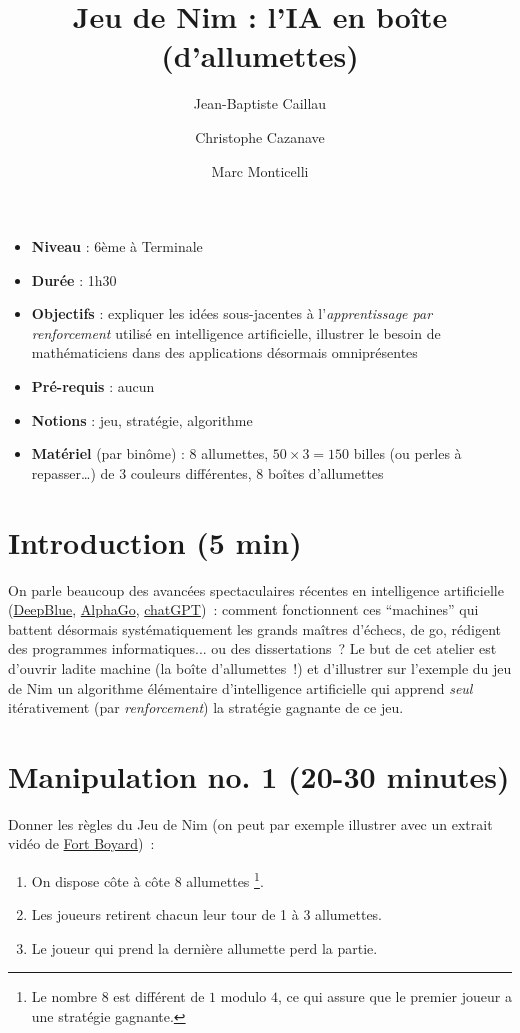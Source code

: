 \documentclass[a4paper,12pt]{article}
\title{\bf Jeu de Nim : l'IA en boîte (d'allumettes)}
\author{\normalsize Jean-Baptiste Caillau}
\author{\normalsize Christophe Cazanave}
\author{\normalsize Marc Monticelli}
\affil{Université Côte d’Azur, CNRS, LJAD, France}
\date{}
\begin{document}
\maketitle
\label{jeu-de-nim-lia-en-boite-dallumettes}

\begin{itemize}
\item
  \textbf{Niveau} : 6ème à Terminale
\item
  \textbf{Durée} : 1h30
\item
  \textbf{Objectifs} : expliquer les idées sous-jacentes à l'\emph{apprentissage par renforcement} utilisé en intelligence artificielle, illustrer le besoin de mathématiciens dans des applications désormais omniprésentes
\item
  \textbf{Pré-requis} : aucun
\item
  \textbf{Notions} : jeu, stratégie, algorithme
\item
  \textbf{Matériel} (par binôme) : 8 allumettes, $50 \times 3 = 150$ billes (ou perles à repasser\ldots) de 3 couleurs différentes, 8 boîtes d'allumettes
\end{itemize}

\section{Introduction (5 min)} \label{introduction-5-min}
\noindent On parle beaucoup des avancées spectaculaires récentes en intelligence artificielle (\href{https://www.ibm.com/ibm/history/ibm100/us/en/icons/deepblue}{DeepBlue}, \href{https://www.deepmind.com/research/highlighted-research}{AlphaGo}, \href{https://openai.com/blog/chatgpt}{chatGPT})~: comment fonctionnent ces ``machines'' qui battent désormais systématiquement les grands maîtres d'échecs, de go, rédigent des programmes informatiques... ou des dissertations~? Le but de cet atelier est d'ouvrir ladite machine (la boîte d'allumettes~!) et d'illustrer sur l'exemple du jeu de Nim un algorithme élémentaire d'intelligence artificielle qui apprend \emph{seul} itérativement (par \emph{renforcement}) la stratégie gagnante de ce jeu.

\section{Manipulation no. 1 (20-30 minutes)} \label{manipulation-no.-1-20-30-minutes}
\noindent Donner les règles du Jeu de Nim (on peut par exemple illustrer avec un extrait vidéo de \href{https://fortboyard.tv}{Fort Boyard})~:
\begin{enumerate}
  \item On dispose côte à côte 8 allumettes \footnote{Le nombre \(8\) est différent de \(1\) modulo \(4\), ce qui assure que le premier joueur a une stratégie gagnante.}.
  \item Les joueurs retirent chacun leur tour de 1 à 3 allumettes.
  \item Le joueur qui prend la dernière allumette perd la partie.
\end{enumerate}
\end{document}
